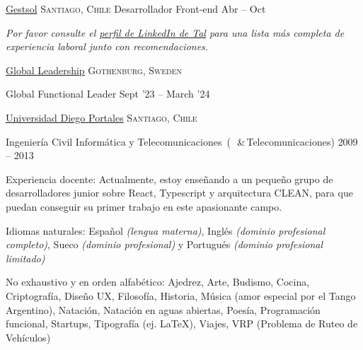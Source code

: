 \documentclass[10pt,a4paper]{article}
\begin{document}
\headedsection
  {\href{http://www.gestsol.cl}{Gestsol}}
  {\textsc{Santiago, Chile}} {%
  \headedsubsection
    {Desarrollador Front-end}
    {Abr -- Oct }
    {}
}


\vspace{-0.2em}
\begin{center}
  \emph{\small Por favor consulte el \href{https://www.linkedin.com/in/tali-berenstein-torres-94055726b/}{perfil de LinkedIn de Tal} para una lista más completa de experiencia laboral junto con recomendaciones.}
\end{center}


\spacedhrule{-0.2em}{-0.4em}


\headedsection
  {\href{https://www.globalleadership.com/en/l}{Global Leadership}}
  {\textsc{Gothenburg, Sweden}} {%
  \headedsubsection
    {Global Functional Leader}
    {Sept '23 -- March '24}
    
}

\headedsection
  {\href{http://www.udp.cl}{Universidad Diego Portales}}
  {\textsc{Santiago, Chile}} {%
  \headedsubsection
    {Ingeniería Civil Informática y Telecomunicaciones\textnormal{~(~\,\&\,Telecomunicaciones)}}
    {2009 -- 2013}
    
}


\spacedhrule{0.5em}{-0.4em}


\inlineheadsection  %
  {Experiencia docente:}
  {  Actualmente, estoy enseñando a un pequeño grupo de desarrolladores junior sobre React, Typescript y arquitectura CLEAN, para que puedan conseguir su primer trabajo en este apasionante campo. }

\vspace{0.5em}
\inlineheadsection
  {Idiomas naturales:}
  {Español \emph{(lengua materna)}, Inglés \emph{(dominio profesional completo)}, Sueco \emph{(dominio profesional)} y Portugués \emph{(dominio profesional limitado)} }


\spacedhrule{1.6em}{-0.4em}


\inlineheadsection
  {No exhaustivo y en orden alfabético:}
  {Ajedrez, Arte, Budismo, Cocina, Criptografía, Diseño UX, Filosofía, Historia, Música (amor especial por el Tango Argentino), Natación, Natación en aguas abiertas, Poesía, Programación funcional, Startups, Tipografía (ej. LaTeX), Viajes, VRP (Problema de Ruteo de Vehículos)}
\end{document}
